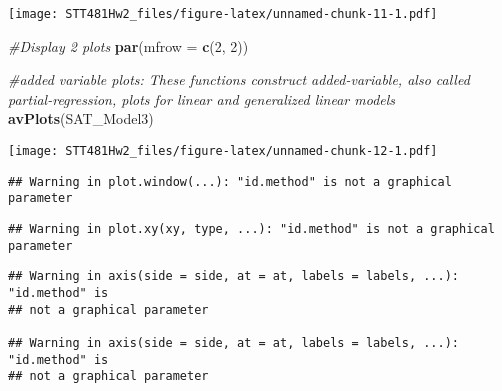 \documentclass[]{article}
\newenvironment{Shaded}{\begin{snugshade}}{\end{snugshade}}
\newcommand{\KeywordTok}[1]{\textcolor[rgb]{0.13,0.29,0.53}{\textbf{#1}}}
\newcommand{\DataTypeTok}[1]{\textcolor[rgb]{0.13,0.29,0.53}{#1}}
\newcommand{\DecValTok}[1]{\textcolor[rgb]{0.00,0.00,0.81}{#1}}
\newcommand{\StringTok}[1]{\textcolor[rgb]{0.31,0.60,0.02}{#1}}
\newcommand{\CommentTok}[1]{\textcolor[rgb]{0.56,0.35,0.01}{\textit{#1}}}
\newcommand{\OperatorTok}[1]{\textcolor[rgb]{0.81,0.36,0.00}{\textbf{#1}}}
\newcommand{\NormalTok}[1]{#1}
\begin{document}
\texttt{[image: STT481Hw2\_files/figure-latex/unnamed-chunk-11-1.pdf]}

\begin{Shaded}
\begin{Highlighting}[]
\CommentTok{#Display 2 plots }
\KeywordTok{par}\NormalTok{(}\DataTypeTok{mfrow =} \KeywordTok{c}\NormalTok{(}\DecValTok{2}\NormalTok{, }\DecValTok{2}\NormalTok{))}

\CommentTok{#added variable plots: These functions construct added-variable, also called partial-regression, plots for linear and generalized linear models}
\KeywordTok{avPlots}\NormalTok{(SAT_Model3)}
\end{Highlighting}
\end{Shaded}

\texttt{[image: STT481Hw2\_files/figure-latex/unnamed-chunk-12-1.pdf]}

\begin{Shaded}
\end{Shaded}

\begin{verbatim}
## Warning in plot.window(...): "id.method" is not a graphical parameter
\end{verbatim}

\begin{verbatim}
## Warning in plot.xy(xy, type, ...): "id.method" is not a graphical parameter
\end{verbatim}

\begin{verbatim}
## Warning in axis(side = side, at = at, labels = labels, ...): "id.method" is
## not a graphical parameter

## Warning in axis(side = side, at = at, labels = labels, ...): "id.method" is
## not a graphical parameter
\end{verbatim}
\end{document}
